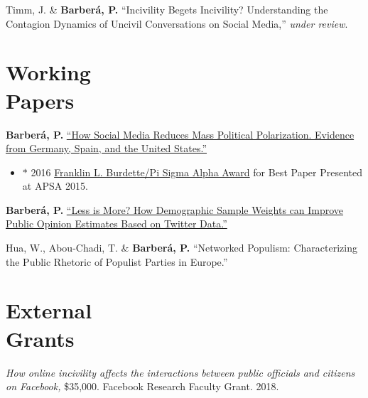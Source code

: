 \documentclass[margin,line,11pt]{resume}
\begin{document}
\begin{resume}
\newpage   

Timm, J. \& \textbf{Barber\'{a}, P.} ``Incivility Begets Incivility? Understanding the Contagion Dynamics of Uncivil Conversations on Social Media,'' \textit{under review}.

    \section{\mysidestyle Working\\Papers} 

\textbf{Barber\'{a}, P.} \href{http://www.pablobarbera.com/static/barbera_polarization_APSA.pdf}{``How Social Media Reduces Mass Political Polarization. Evidence from Germany, Spain, and the United States.''} 
\begin{itemize}
\item[] $\ast$ 2016 \href{http://www.apsanet.org/PROGRAMS/APSA-Awards/Franklin-L-Burdette-Pi-Sigma-Alpha-Award}{Franklin L. Burdette/Pi Sigma Alpha Award} for Best Paper Presented at APSA 2015.
\end{itemize}  

\textbf{Barber\'{a}, P.} \href{http://pablobarbera.com/static/less-is-more.pdf}{``Less is More? How Demographic Sample Weights can Improve Public Opinion Estimates Based on Twitter Data.''}


Hua, W., Abou-Chadi, T. \& \textbf{Barber\'{a}, P.} ``Networked Populism: Characterizing the Public Rhetoric of
Populist Parties in Europe.''






        \section{\mysidestyle External \\ Grants}
        
\textit{How online incivility affects the interactions between public officials and citizens on Facebook,} \$35,000. Facebook Research Faculty Grant. 2018.        
        

\end{resume}
\end{document}
